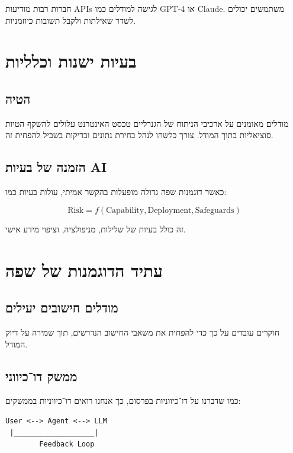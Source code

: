 חברות רבות מודיעות \textenglish{API}s לגישה למודלים כמו \textenglish{GPT-4}
או \textenglish{Claude}. משתמשים יכולים לשדר שאילתות ולקבל תשובות כיוזמניות.

\section{בעיות ישנות וכלליות}

\subsection{הטיה}

מודלים מאומנים על ארכיבי הניתוח של הגנרליים טכסט האינטרנט
עלולים להשקף הטיות סוציאליות בתוך המודל.
צורך כלשהו לנהל בחירת נתונים ובדיקות בשביל להפחית זה.

\subsection{הזמנה של בעיות \textenglish{AI}}

כאשר דוגמנות שפה גדולה מופעלות בהקשר אמיתי, עולות בעיות כמו:

\begin{equation}
\text{Risk} = f(\text{Capability}, \text{Deployment}, \text{Safeguards})
\end{equation}

זה כולל בעיות של שלילות, מניפולציה, וציפוי מידע אישי.

\section{עתיד הדוגמנות של שפה}

\subsection{מודלים חישובים יעילים}

חוקרים עובדים על כך כדי להפחית את משאבי החישוב הנדרשים,
תוך שמירה על דיוק המודל.

\subsection{ממשק דו־כיווני}

כמו שדברנו על דו־כיווניות בפרסום, כך אנחנו רואים דו־כיווניות בממשקים:

\begin{LTR}
\begin{verbatim}
User <--> Agent <--> LLM
 |___________________|
        Feedback Loop
\end{verbatim}
\end{LTR}

